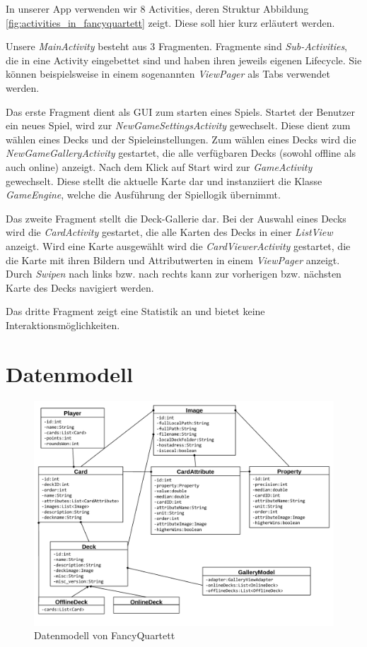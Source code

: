 In unserer App verwenden wir 8 Activities, deren Struktur Abbildung \ref{fig:activities_in_fancyquartett} zeigt. Diese soll hier kurz erläutert werden.

Unsere \emph{MainActivity} besteht aus 3 Fragmenten. Fragmente sind \emph{Sub-Activities}, die in eine Activity eingebettet sind und haben ihren jeweils eigenen Lifecycle. Sie können beispielsweise in einem sogenannten \emph{ViewPager} als Tabs verwendet werden.

Das erste Fragment dient als GUI zum starten eines Spiels. Startet der Benutzer ein neues Spiel, wird zur \emph{NewGameSettingsActivity} gewechselt. Diese dient zum wählen eines Decks und der Spieleinstellungen. Zum wählen eines Decks wird die \emph{NewGameGalleryActivity} gestartet, die alle verfügbaren Decks (sowohl offline als auch online) anzeigt. Nach dem Klick auf Start wird zur \emph{GameActivity} gewechselt. Diese stellt die aktuelle Karte dar und instanziiert die Klasse \emph{GameEngine}, welche die Ausführung der Spiellogik übernimmt.

Das zweite Fragment stellt die Deck-Gallerie dar. Bei der Auswahl eines Decks wird die \emph{CardActivity} gestartet, die alle Karten des Decks in einer \emph{ListView} anzeigt. Wird eine Karte ausgewählt wird die \emph{CardViewerActivity} gestartet, die die Karte mit ihren Bildern und Attributwerten in einem \emph{ViewPager} anzeigt. Durch \emph{Swipen} nach links bzw. nach rechts kann zur vorherigen bzw. nächsten Karte des Decks navigiert werden.

Das dritte Fragment zeigt eine Statistik an und bietet keine Interaktionsmöglichkeiten.

\section{Datenmodell}
\label{sec:datenmodell}

\begin{figure}[ht]
    \centering
    \includegraphics[width=\textwidth]{../img/Datenmodell.pdf}
    \caption{Datenmodell von FancyQuartett}
    \label{fig:datenmodell}
\end{figure}

